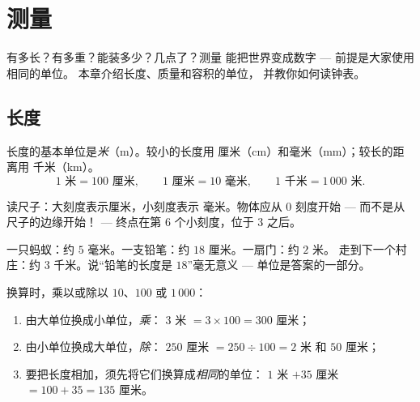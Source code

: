 \chapter{测量}\label{ch:g3:measure}

有多长？有多重？能装多少？几点了？测量
能把世界变成数字 --- 前提是大家使用相同的单位。
本章介绍长度、质量和容积的单位，
并教你如何读钟表。

\section{长度}

\begin{definition}[长度单位]\label{def:g3:measure:length}
长度的基本单位是\emph{米}（m）。较小的长度用
厘米（cm）和毫米（mm）；较长的距离用
千米（km）。
\[
1 \text{ 米} = 100 \text{ 厘米}, \qquad
1 \text{ 厘米} = 10 \text{ 毫米}, \qquad
1 \text{ 千米} = 1\,000 \text{ 米}.
\]
\end{definition}

\begin{omfigure}

{\small 读尺子：大刻度表示厘米，小刻度表示
毫米。物体应从 $0$ 刻度开始 --- 而不是从
尺子的边缘开始！ --- 终点在第 $6$ 个小刻度，位于 $3$ 之后。}
\end{omfigure}

\begin{example}[选择合适的单位]\label{ex:g3:measure:choose}
一只蚂蚁：约 $5$ 毫米。一支铅笔：约 $18$ 厘米。一扇门：约 $2$ 米。
走到下一个村庄：约 $3$ 千米。说“铅笔的长度是
$18$”毫无意义 --- 单位是答案的一部分。
\end{example}

\begin{method}[单位换算]\label{met:g3:measure:convert}
换算时，乘以或除以 $10$、$100$ 或 $1\,000$：
\begin{enumerate}
  \item 由大单位换成小单位，\emph{乘}：
        $3$ 米 $= 3 \times 100 = 300$ 厘米；
  \item 由小单位换成大单位，\emph{除}：
        $250$ 厘米 $= 250 \div 100 = 2$ 米 和 $50$ 厘米；
  \item 要把长度相加，须先将它们换算成\emph{相同}的单位：
        $1$ 米 $+ 35$ 厘米 $= 100 + 35 = 135$ 厘米。
\end{enumerate}
\end{method}

